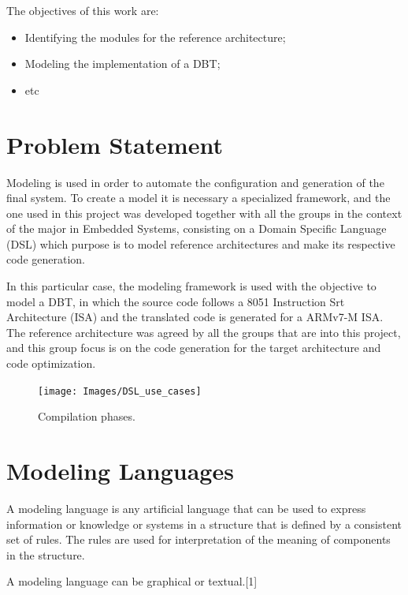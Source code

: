 \documentclass{report}
\begin{document}
	\par The objectives of this work are:
	\begin{itemize}
		\item Identifying the modules for the reference architecture;
		\item Modeling the implementation of a DBT;
		\item etc
	\end{itemize}

	\section{Problem Statement}
	
	\par Modeling is used in order to automate the configuration and generation of the final system. To create a model it is necessary a specialized framework, and the one used in this project was developed together with all the groups in the context of the major in Embedded Systems, consisting on a Domain Specific Language (DSL) which purpose is to model reference architectures and make its respective code generation. 
	\par In this particular case, the modeling framework is used with the objective to model a DBT, in which the source code follows a 8051 Instruction Srt Architecture (ISA) and the translated code is generated for a ARMv7-M ISA.  The reference architecture was agreed by all the groups that are into this project, and this group focus is on the code generation for the target architecture and code optimization.
	
	\begin{figure} [h]
		\centering
		\texttt{[image: Images/DSL\_use\_cases]}
		\caption{Compilation phases.}
		\label{fig:compiler-sequence}
	\end{figure}

	\section{Modeling Languages}
	\par A modeling language is any artificial language that can be used to express information or knowledge or systems in a structure that is defined by a consistent set of rules. The rules are used for interpretation of the meaning of components in the structure.
	
	\par A modeling language can be graphical or textual.[1]
	
\end{document}
